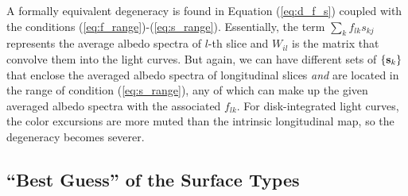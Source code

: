 \documentclass[iop,numberedappendix,apj,]{emulateapj}
\begin{document}
A formally equivalent degeneracy is found in Equation (\ref{eq:d_f_s}) coupled with the conditions (\ref{eq:f_range})-(\ref{eq:s_range}). 
Essentially, the term $\sum _k f_{lk} s_{kj}$ represents the average albedo spectra of $l$-th slice and $W_{il}$ is the matrix that convolve them into the light curves. 
But again, we can have different sets of $\{ {\bf s}_k \}$ that enclose the averaged albedo spectra of longitudinal slices {\it and} are located in the range of condition (\ref{eq:s_range}), any of which can make up the given averaged albedo spectra with the associated $f_{lk}$. 
For disk-integrated light curves, the color excursions are more muted than the intrinsic longitudinal map, so the degeneracy becomes severer. 



\subsection{``Best Guess'' of the Surface Types}
\label{ss:constraining}
\end{document}
